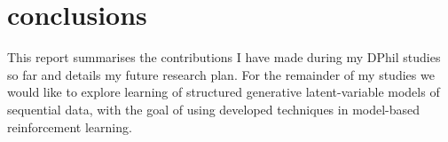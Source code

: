 \section{conclusions}
\label{sec:conclusions}

    This report summarises the contributions I have made during my DPhil studies so far and details my future research plan. For the remainder of my studies we would like to explore learning of structured generative latent-variable models of sequential data, with the goal of using developed techniques in model-based reinforcement learning.
